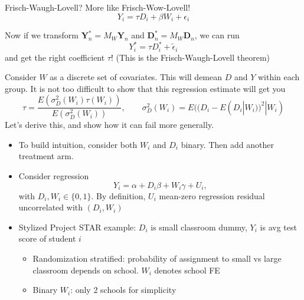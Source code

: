 \documentclass[notes,11pt, aspectratio=169]{beamer}
\newcommand\1{\operatorname{\mathbbm{1}}\indicatorfence}
\newenvironment{wideitemize}{\itemize\addtolength{\itemsep}{10pt}}{\enditemize}
\begin{document}
\begin{frame}{Frisch-Waugh-Lovell? More like Frisch-Wow-Lovell!}
  $$ Y_{i} = \tau D_{i} + \beta W_{i} + \epsilon_{i}$$
  \begin{wideitemize}
  \item Now if we transform $\mathbf{Y}_{n}^{*} = M_{W}\mathbf{Y}_{n}$ and $\mathbf{D}_{n}^{*} = M_{W}\mathbf{D}_{n}$, we can run
    $$ Y_{i}^{*} = \tau D^{*}_{i} +  \tilde{\epsilon}_{i}$$
    and get the right coefficient $\tau$! (This is the Frisch-Waugh-Lovell theorem)
  \item Consider $W$ as a discrete set of covariates. This will
    demean $D$ and $Y$ within each group. It is not too difficult to
    show that this regression estimate will get you
    \begin{equation}
      \tau = \frac{E(\sigma^{2}_{D}(W_{i})\tau(W_{i}))}{E(\sigma^{2}_{D}(W_{i}))}, \qquad \sigma^{2}_{D}(W_{i}) = E((D_{i} - E(D_{i}|W_{i}))^{2} | W_{i})
    \end{equation}
    Let's derive this, and show how it can fail more generally.
  \end{wideitemize}
\end{frame}

\begin{frame}
  \begin{itemize}
  \item To build intuition, consider both $W_{i}$ and $D_{i}$ binary. Then add another treatment arm.
  \item Consider regression
    \begin{equation*}
      Y_i=\alpha + D_{i}\beta+W_{i}\gamma +U_i,
    \end{equation*}
    with $D_{i},W_{i}\in\{0,1\}$. \alert{By definition}, $U_{i}$ mean-zero
    regression residual uncorrelated with $(D_{i},W_{i})$
  \item Stylized Project STAR example: $D_{i}$ is small classroom dummy, $Y_{i}$
    is avg test score of student $i$
    \begin{itemize}
    \item Randomization stratified: probability of assignment to small vs large
      classroom depends on school. $W_{i}$ denotes school FE
    \item Binary $W_{i}$: only 2 schools for simplicity
    \end{itemize}
  \end{itemize}
\end{frame}
\end{document}
